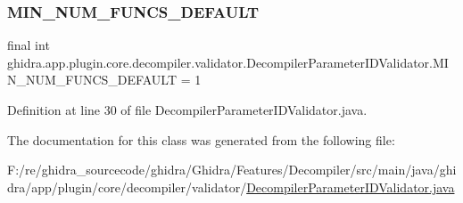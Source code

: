 \subsubsection{\texorpdfstring{MIN\_NUM\_FUNCS\_DEFAULT}{MIN\_NUM\_FUNCS\_DEFAULT}}
{\footnotesize\ttfamily final int ghidra.\+app.\+plugin.\+core.\+decompiler.\+validator.\+Decompiler\+Parameter\+I\+D\+Validator.\+M\+I\+N\+\_\+\+N\+U\+M\+\_\+\+F\+U\+N\+C\+S\+\_\+\+D\+E\+F\+A\+U\+LT = 1\hspace{0.3cm}{\ttfamily [static]}}



Definition at line 30 of file Decompiler\+Parameter\+I\+D\+Validator.\+java.



The documentation for this class was generated from the following file\+:\begin{DoxyCompactItemize}
\item 
F\+:/re/ghidra\+\_\+sourcecode/ghidra/\+Ghidra/\+Features/\+Decompiler/src/main/java/ghidra/app/plugin/core/decompiler/validator/\mbox{\hyperlink{_decompiler_parameter_i_d_validator_8java}{Decompiler\+Parameter\+I\+D\+Validator.\+java}}\end{DoxyCompactItemize}

